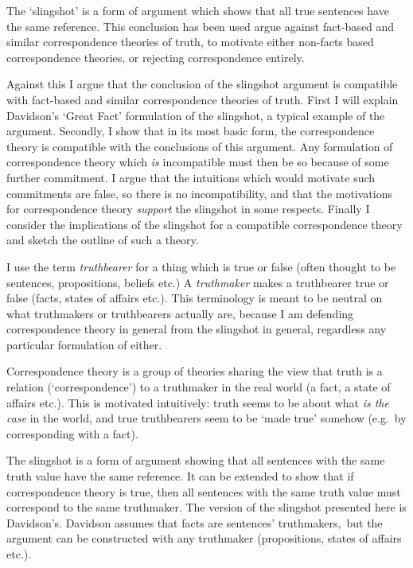 The `slingshot' is a form of argument which shows that all true sentences have the same reference.
This conclusion has been used argue against fact-based and similar correspondence theories of truth, to motivate either non-facts based correspondence theories, or rejecting correspondence entirely.

Against this I argue that the conclusion of the slingshot argument is compatible with fact-based and similar correspondence theories of truth.
First I will explain Davidson's `Great Fact' formulation of the slingshot, a typical example of the argument.
Secondly, I show that in its most basic form, the correspondence theory is compatible with the conclusions of this argument.
Any formulation of correspondence theory which \emph{is} incompatible must then be so because of some further commitment.
I argue that the intuitions which would motivate such commitments are false, so there is no incompatibility, and that the motivations for correspondence theory \emph{support} the slingshot in some respects.
Finally I consider the implications of the slingshot for a compatible correspondence theory and sketch the outline of such a theory.

I use the term \textit{truthbearer} for a thing which is true or false (often thought to be sentences, propositions, beliefs etc.)
A \textit{truthmaker} makes a truthbearer true or false (facts, states of affairs etc.).
This terminology is meant to be neutral on what truthmakers or truthbearers actually are, because I am defending correspondence theory in general from the slingshot in general, regardless any particular formulation of either.

Correspondence theory is a group of theories sharing the view that truth is a relation (`correspondence') to a truthmaker in the real world (a fact, a state of affairs etc.).
This is motivated intuitively: truth seems to be about what \emph{is the case} in the world, and true truthbearers seem to be `made true' somehow (e.g.\ by corresponding with a fact).

The slingshot is a form of argument showing that all sentences with the same truth value have the same reference.
It can be extended to show that if correspondence theory is true, then all sentences with the same truth value must correspond to the same truthmaker.
The version of the slingshot presented here is Davidson's.
\parencite[753]{Davidson_1969}
Davidson assumes that facts are sentences' truthmakers,\footnotemark\ but the argument can be constructed with any truthmaker (propositions, states of affairs etc.).
\parencite*[752]{Davidson_1969}


